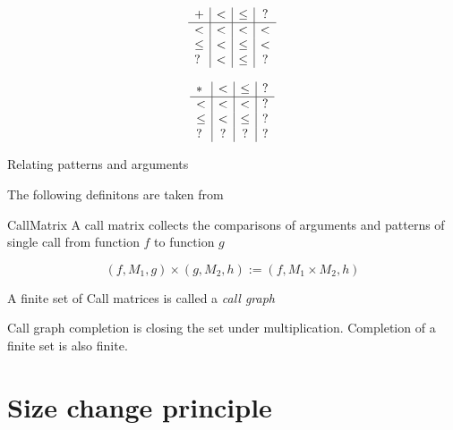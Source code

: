 \begin{definition}
\[
\begin{array}{l | c |c | c }

 +    &  <   &  \leq   &  ? \\
 \hline 
 <    &  <   & <       &  < \\
 \leq &  <   & \leq    &  <  \\
 ?    &  <   & \leq    &  ?
\end{array}
\]

\end{definition}


\begin{definition}
\[
\begin{array}{l | c |c | c}
 *   &  <  &  \leq & ? \\
\hline
  <   & <    & <    &   ? \\
 \leq & <    & \leq &   ?  \\
 ?    & ?    & ?    &   ?
\end{array}
\]
\end{definition}

\begin{definition}{Relating patterns and arguments}
\end{definition}

The following definitons are taken from \cite{abelAltenkirch:predStRec}

\begin{definition}
CallMatrix
A call matrix collects the comparisons of arguments and patterns of single call from function $f$ to function $g$
\end{definition}

\begin{definition}

\[(f,M_1,g) \times (g,M_2,h) := (f,M_1 \times M_2,h)\]
\end{definition}

\begin{definition}
A finite set of Call matrices is called a \emph{call graph}
\end{definition}

\begin{definition}
Call graph completion is closing the set under multiplication.
Completion of a finite set is also finite. 
\end{definition}

\section{Size change principle}


